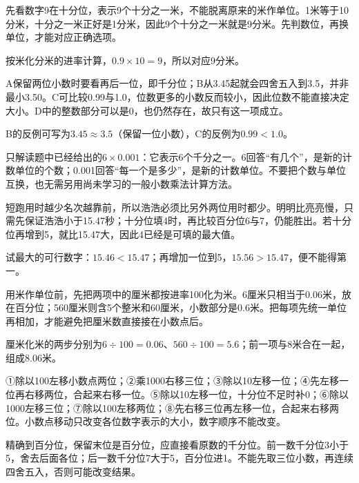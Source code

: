 \documentclass[multi=snippet,border=0pt]{standalone}
\newenvironment{snippet}[3]{\begin{minipage}{#1bp}\color{answerred}\fontsize{#2}{#3}\selectfont\raggedright}{\end{minipage}}
\begin{document}
\begin{snippet}{505}{11.5}{14}先看数字9在十分位，表示9个十分之一米，不能脱离原来的米作单位。1米等于10分米，十分之一米正好是1分米，因此9个十分之一米就是9分米。先判数位，再换单位，才能对应正确选项。\par 按米化分米的进率计算，\(0.9\times10=9\)，所以对应9分米。\end{snippet}
\begin{snippet}{505}{11.5}{14}A保留两位小数时要看再后一位，即千分位；B从3.45起就会四舍五入到3.5，并非最小3.50。C可比较0.99与1.0，位数更多的小数反而较小，因此位数不能直接决定大小。D中的整数部分可以是0，也仍然存在，故只有这一项成立。\par B的反例可写为\(3.45\approx3.5\)（保留一位小数），C的反例为\(0.99<1.0\)。\end{snippet}
\begin{snippet}{505}{11.5}{14}只解读题中已经给出的\(6\times0.001\)：它表示6个千分之一。6回答“有几个”，是新的计数单位的个数；0.001回答“每一个是多少”，是新的计数单位。不要把个数与单位互换，也无需另用尚未学习的一般小数乘法计算方法。\end{snippet}
\begin{snippet}{505}{11.5}{14}短跑用时越少名次越靠前，所以浩浩必须比另外两位用时都少。明明比亮亮慢，只需先保证浩浩小于15.47秒；十分位填4时，再比较百分位6与7，仍能胜出。若十分位再增到5，就比15.47大，因此4已经是可填的最大值。\par 试最大的可行数字：\(15.46<15.47\)；再增加一位到5，\(15.56>15.47\)，便不能得第一。\end{snippet}
\begin{snippet}{505}{11.5}{14}用米作单位前，先把两项中的厘米都按进率100化为米。6厘米只相当于0.06米，放在百分位；560厘米则含5个整米和60厘米，小数部分是0.6米。把每项先统一单位再相加，才能避免把厘米数直接接在小数点后。\par 厘米化米的两步分别为\(6\div100=0.06\)、\(560\div100=5.6\)；前一项与8米合在一起，组成8.06米。\end{snippet}
\begin{snippet}{505}{11.5}{14}①除以100左移小数点两位；②乘1000右移三位；③除以10左移一位；④先左移一位再右移两位，合起来右移一位。⑤除以10左移一位，十分位不足时补0；⑥除以1000左移三位；⑦除以100左移两位；⑧先右移三位再左移一位，合起来右移两位。小数点移动只改变各位数字表示的大小，数字顺序不能改变。\end{snippet}
\begin{snippet}{505}{11.5}{14}精确到百分位，保留末位是百分位，应直接看原数的千分位。前一数千分位3小于5，舍去后面各位；后一数千分位7大于5，百分位进1。不能先取三位小数，再连续四舍五入，否则可能改变结果。\end{snippet}
\end{document}
